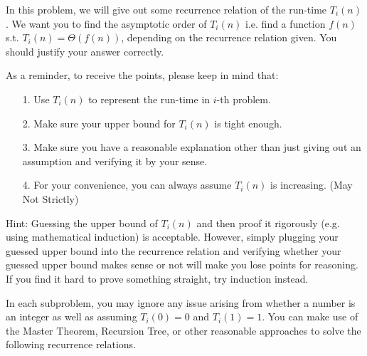 
In this problem, we will give out some recurrence relation of the run-time $T_i(n)$. We want you to find the asymptotic order of $T_i(n)$ i.e. find a function $f(n)$ s.t. $T_i(n) = \Theta(f(n))$, depending on the recurrence relation given. You should justify your answer correctly.

As a reminder, to receive the points, please keep in mind that:

\begin{itemize}
    \item[1.] Use $T_i(n)$ to represent the run-time in $i$-th problem.
    \item[2.] Make sure your upper bound for $T_i(n)$ is tight enough.
    \item[3.] Make sure you have a reasonable explanation other than just giving out an assumption and verifying it by your sense. 
    \item[4.] For your convenience, you can always assume $T_i(n)$ is increasing. (May Not Strictly)
\end{itemize}

Hint: Guessing the upper bound of $T_i(n)$ and then proof it rigorously (e.g. using mathematical induction) is acceptable. However, simply plugging your guessed upper bound into the recurrence relation and verifying whether your guessed upper bound makes sense or not will make you lose points for reasoning. If you find it hard to prove something straight, try induction instead.

In each subproblem, you may ignore any issue arising from whether a number is an integer as well as assuming \(T_i(0) = 0\) and \(T_i(1) = 1\). You can make use of the Master Theorem, Recursion Tree, or other reasonable approaches to solve the following recurrence relations. 

